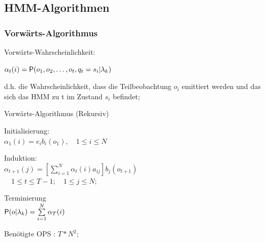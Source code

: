 \documentclass[german,color,6pt]{latex4ei/latex4ei_sheet}
\begin{document}
\subsection{HMM-Algorithmen}
\begin{sectionbox}
\subsubsection{Vorwärts-Algorithmus}
Vorwärts-Wahrscheinlichkeit:

$\alpha_t (i) = \P(o_1, o_2, \dots , o_t , q_t = s_i | \lambda_k)$

d.h. die Wahrscheinlichkeit, dass die Teilbeobachtung $o_i$ emittiert werden und das sich das HMM zu t im Zustand $s_i$ befindet;

\begin{cookbox}{Vorwärts-Algorithmus (Rekursiv)}
	\item Initialisierung: \\
		$\alpha_1(i) = e_i b_i (o_1), \quad 1 \leq i \leq N $\\
	\item Induktion: \\
		$ \alpha_{t+1} (j) = \left[ \sum\limits_{i=1}^N{\alpha_t (i) a_{ij}} \right] b_j (o_{t+1}) $\\
		$  \quad 1 \leq t \leq T-1; \quad 1 \leq j \leq N;$\\
	\item Terminierung \\
		$\P(o|\lambda_k )= \sum\limits_{i=1}^N \alpha _T (i)$\\
\end{cookbox}
Benötigte OPS : $T * N^2$;
\end{sectionbox}
\end{document}
